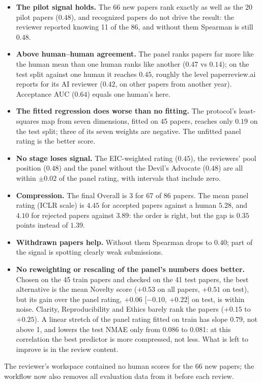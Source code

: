 \documentclass[11pt,a4paper]{article}
\begin{document}
\begin{itemize}
\item \textbf{The pilot signal holds.} The 66 new papers rank exactly as well as the 20 pilot
papers ($0.48$), and recognized papers do not drive the result: the reviewer reported knowing 11
of the 86, and without them Spearman is still $0.48$.
\item \textbf{Above human--human agreement.} The panel ranks papers
far more like the human mean than one human ranks like another ($0.47$ vs $0.14$); on the test
split against one human it reaches $0.45$, roughly the level paperreview.ai reports for its AI
reviewer ($0.42$, on other papers from another year). Acceptance AUC ($0.64$) equals one human's here.
\item \textbf{The fitted regression does worse than no fitting.} The protocol's least-squares map
from seven dimensions, fitted on 45 papers, reaches only $0.19$ on the test split; three of its
seven weights are negative. The unfitted panel rating is the better score.
\item \textbf{No stage loses signal.} The EIC-weighted rating ($0.45$), the reviewers' pool
position ($0.48$) and the panel without the Devil's Advocate ($0.48$) are all within $\pm0.02$ of
the panel rating, with intervals that include zero.
\item \textbf{Compression.} The final Overall is 3 for 67 of 86 papers. The mean panel rating
(ICLR scale) is $4.45$ for accepted papers against a human $5.28$, and $4.10$ for rejected papers
against $3.89$: the order is right, but the gap is $0.35$ points instead of $1.39$.
\item \textbf{Withdrawn papers help.} Without them Spearman drops to $0.40$; part of the signal is
spotting clearly weak submissions.
\item \textbf{No reweighting or rescaling of the panel's numbers does better.} Chosen on the 45
train papers and checked on the 41 test papers, the best alternative is the mean Novelty score
($+0.53$ on all papers, $+0.51$ on test), but its gain over the panel rating, $+0.06$ [$-0.10$,
$+0.22$] on test, is within noise. Clarity, Reproducibility and Ethics barely rank the papers
($+0.15$ to $+0.25$). A linear stretch of the panel rating fitted on train has slope 0.79, not
above 1, and lowers the test NMAE only from 0.086 to 0.081: at this correlation the best
predictor is more compressed, not less. What is left to improve is in the review content.
\end{itemize}
The reviewer's workspace contained no human scores for the 66 new papers; the
workflow now also removes all evaluation data from it before each review.
\end{document}
